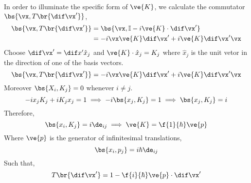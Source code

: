 \documentclass{article}
\begin{document}
In order to illuminate the specific form of $\ve{K}$, we calculate the commutator $\bs{\vx, T\br{\dif \vx'}}$,
\begin{align*}
\bs{\vx, T\br{\dif \vx'}} &= \bs{\vx, \mathbb{I} - i \ve{K}\cdot\dif\vx'} \\
&= -i \vx \ve{K} \dif \vx' + i \ve{K} \dif \vx' \vx
\end{align*}
Choose $\dif \vx' = \dif x' \hat{x}_j$ and $\ve{K} \cdot \hat{x}_j = K_j$ where $\hat{x}_j$ is the unit vetor in the direction of one of the basis vectors.
\[ \bs{\vx, T\br{\dif \vx'}} = -i \vx \ve{K} \dif \vx' + i \ve{K} \dif \vx' \vx \]
Moreover $\bs{X_i, K_j} = 0$ whenever $i \neq j$.
\[ -i x_j K_j + i K_j x_j = 1 \implies -i \bs{x_j, K_j} = 1 \implies \bs{x_j, K_j} = i \]
Therefore,
\[ \bs{x_i, K_j} = i \de_{ij} \implies \ve{K} = \f{1}{\hbar} \ve{p} \]
Where $\ve{p}$ is the generator of infinitesimal translations,
\[ \bs{x_i, p_j} = i \hbar \de_{ij} \]
Such that,
\[ T\br{\dif \vx'} = 1 - \f{i}{\hbar} \ve{p} \cdot \dif \vx' \]
\end{document}

